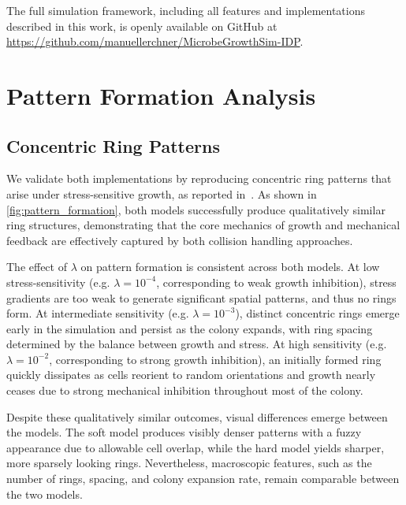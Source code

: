 \documentclass[conference]{IEEEtran}
\begin{document}
The full simulation framework, including all features and implementations described in this work, is openly available on GitHub at \url{https://github.com/manuellerchner/MicrobeGrowthSim-IDP}.

\newpage

\section{Pattern Formation Analysis}

\subsection{Concentric Ring Patterns}

We validate both implementations by reproducing concentric ring patterns that arise under stress-sensitive growth, as reported in~\cite{Weady2024}. As shown in \autoref{fig:pattern_formation}, both models successfully produce qualitatively similar ring structures, demonstrating that the core mechanics of growth and mechanical feedback are effectively captured by both collision handling approaches.

The effect of $\lambda$ on pattern formation is consistent across both models. At low stress-sensitivity (e.g. $\lambda = 10^{-4}$, corresponding to weak growth inhibition), stress gradients are too weak to generate significant spatial patterns, and thus no rings form. At intermediate sensitivity (e.g. $\lambda = 10^{-3}$), distinct concentric rings emerge early in the simulation and persist as the colony expands, with ring spacing determined by the balance between growth and stress. At high sensitivity (e.g. $\lambda = 10^{-2}$, corresponding to strong growth inhibition), an initially formed ring quickly dissipates as cells reorient to random orientations and growth nearly ceases due to strong mechanical inhibition throughout most of the colony.

Despite these qualitatively similar outcomes, visual differences emerge between the models. The soft model produces visibly denser patterns with a fuzzy appearance due to allowable cell overlap, while the hard model yields sharper, more sparsely looking rings. Nevertheless, macroscopic features, such as the number of rings, spacing, and colony expansion rate, remain comparable between the two models.
\end{document}
